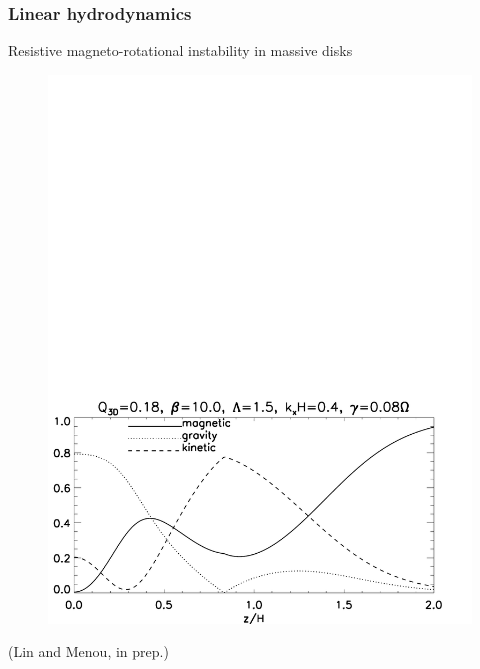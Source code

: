 \documentclass[10pt]{beamer}
\begin{document}
\begin{frame}[t]
  \frametitle{Linear hydrodynamics}
  \centering
    \begin{onlinebox}{9cm}Resistive magneto-rotational instability in
      massive disks\end{onlinebox}
   \begin{figure}
   \includegraphics[scale=0.55,clip=true, trim=0cm 0cm 1.45cm 16.43cm]{result.pdf}
   \end{figure} 
  
(Lin and Menou, in prep.) 
\end{frame}
\end{document}
